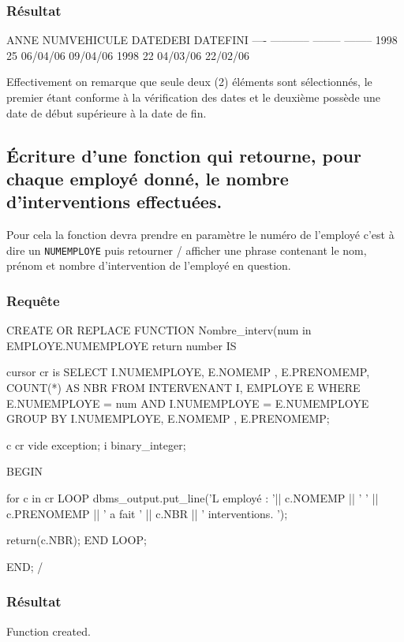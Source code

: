 \documentclass[•]{article}
\begin{document}
\subsubsection{Résultat}
\begin{sql}
ANNE NUMVEHICULE DATEDEBI DATEFINI
---- ----------- -------- --------
1998          25 06/04/06 09/04/06
1998          22 04/03/06 22/02/06
\end{sql}
Effectivement on remarque que seule deux (2) éléments sont sélectionnés, le premier étant conforme à la vérification des dates et le deuxième possède une date de début supérieure à la date de fin. 

\subsection{Écriture d'une fonction qui retourne, pour chaque employé donné, le nombre d'interventions effectuées.}
Pour cela la fonction devra prendre en paramètre le numéro de l'employé c'est à dire un \texttt{NUMEMPLOYE} puis retourner / afficher une phrase contenant le nom, prénom et nombre d'intervention de l'employé en question. 
\subsubsection{Requête}
\begin{sql}
CREATE OR REPLACE FUNCTION Nombre_interv(num in EMPLOYE.NUMEMPLOYE%
return number
IS 

cursor cr is SELECT I.NUMEMPLOYE, E.NOMEMP , E.PRENOMEMP, COUNT(*) AS NBR
FROM INTERVENANT I, EMPLOYE E 
WHERE E.NUMEMPLOYE = num
AND I.NUMEMPLOYE = E.NUMEMPLOYE
GROUP BY I.NUMEMPLOYE, E.NOMEMP , E.PRENOMEMP;

c cr%
vide exception;
i binary_integer;

BEGIN

for c in cr LOOP
	dbms_output.put_line('L employé : '|| c.NOMEMP || ' ' || c.PRENOMEMP || ' a fait ' || c.NBR || ' interventions. ');
	
	return(c.NBR);
END LOOP;

END;
/
\end{sql}

\subsubsection{Résultat}
\begin{sql}
Function created.
\end{sql}
\end{document}
